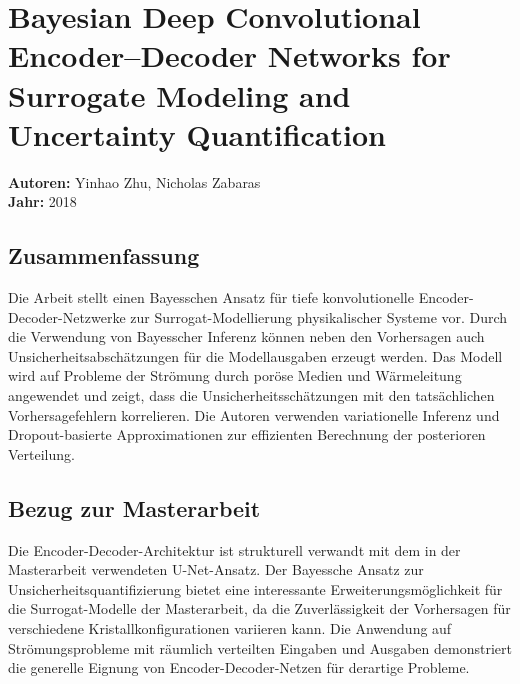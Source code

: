 \documentclass[a4paper,12pt]{article}
\begin{document}
\section*{Bayesian Deep Convolutional Encoder--Decoder Networks for Surrogate Modeling and Uncertainty Quantification}
\textbf{Autoren:} Yinhao Zhu, Nicholas Zabaras \\
\textbf{Jahr:} 2018

\subsection*{Zusammenfassung}
Die Arbeit stellt einen Bayesschen Ansatz für tiefe konvolutionelle Encoder-Decoder-Netzwerke zur Surrogat-Modellierung physikalischer Systeme vor. Durch die Verwendung von Bayesscher Inferenz können neben den Vorhersagen auch Unsicherheitsabschätzungen für die Modellausgaben erzeugt werden. Das Modell wird auf Probleme der Strömung durch poröse Medien und Wärmeleitung angewendet und zeigt, dass die Unsicherheitsschätzungen mit den tatsächlichen Vorhersagefehlern korrelieren. Die Autoren verwenden variationelle Inferenz und Dropout-basierte Approximationen zur effizienten Berechnung der posterioren Verteilung.

\subsection*{Bezug zur Masterarbeit}
Die Encoder-Decoder-Architektur ist strukturell verwandt mit dem in der Masterarbeit verwendeten U-Net-Ansatz. Der Bayessche Ansatz zur Unsicherheitsquantifizierung bietet eine interessante Erweiterungsmöglichkeit für die Surrogat-Modelle der Masterarbeit, da die Zuverlässigkeit der Vorhersagen für verschiedene Kristallkonfigurationen variieren kann. Die Anwendung auf Strömungsprobleme mit räumlich verteilten Eingaben und Ausgaben demonstriert die generelle Eignung von Encoder-Decoder-Netzen für derartige Probleme.
\end{document}
